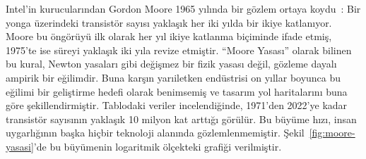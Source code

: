 Intel'in kurucularından Gordon Moore 1965 yılında bir gözlem ortaya koydu~\cite{moore1965}: Bir yonga üzerindeki transistör sayısı yaklaşık her iki yılda bir ikiye katlanıyor. Moore bu öngörüyü ilk olarak her yıl ikiye katlanma biçiminde ifade etmiş, 1975'te ise süreyi yaklaşık iki yıla revize etmiştir. ``Moore Yasası'' olarak bilinen bu kural, Newton yasaları gibi değişmez bir fizik yasası değil, gözleme dayalı ampirik bir eğilimdir. Buna karşın yarıiletken endüstrisi on yıllar boyunca bu eğilimi bir geliştirme hedefi olarak benimsemiş ve tasarım yol haritalarını buna göre şekillendirmiştir. Tablodaki veriler incelendiğinde, 1971'den 2022'ye kadar transistör sayısının yaklaşık 10 milyon kat arttığı görülür. Bu büyüme hızı, insan uygarlığının başka hiçbir teknoloji alanında gözlemlenmemiştir. Şekil~\ref{fig:moore-yasasi}'de bu büyümenin logaritmik ölçekteki grafiği verilmiştir.

